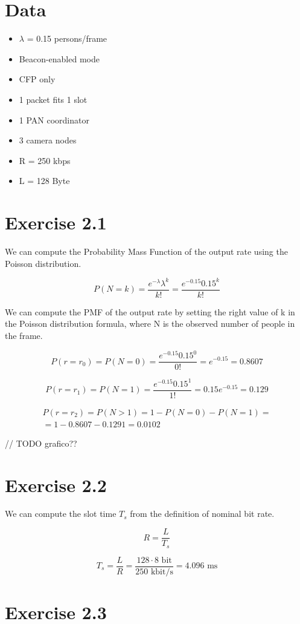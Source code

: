 \section{Data}
\begin{itemize}
\item $\lambda$ = 0.15 persons/frame
\item Beacon-enabled mode
\item CFP only
\item 1 packet fits 1 slot
\item 1 PAN coordinator
\item 3 camera nodes
\item R = 250 kbps
\item L = 128 Byte
\end{itemize}

\section{Exercise 2.1}
We can compute the Probability Mass Function of the output rate using the Poisson distribution.

\begin{equation}
P(N = k) = \frac{e^{-\lambda} \lambda^k}{k!} = \frac{e^{-0.15} 0.15^k}{k!}
\end{equation}

We can compute the PMF of the output rate by setting the right value of k in the Poisson distribution formula, where N is the observed number of people in the frame.

\begin{equation}
P(r = r_0) = P(N = 0) = \frac{e^{-0.15} 0.15^0}{0!} = e^{-0.15} = 0.8607
\end{equation}

\begin{equation}
P(r = r_1) = P(N = 1) = \frac{e^{-0.15} 0.15^1}{1!} = 0.15 e^{-0.15} = 0.129
\end{equation}

\begin{equation}
\begin{split}
	P(r = r_2) = P(N > 1) = 1 - P(N = 0) - P(N = 1) = \\
	= 1- 0.8607 - 0.1291 = 0.0102
\end{split}
\end{equation}

// TODO grafico??

\section{Exercise 2.2}
We can compute the slot time $T_{s}$ from the definition of nominal bit rate.

\begin{equation}
R = \frac{L}{T_{s}}
\end{equation}

\begin{equation}
T_{s} = \frac{L}{R} = \frac{128 \cdot 8\text{ bit}}{250\text{ kbit/s}} = 4.096\text{ ms}
\end{equation}

\section{Exercise 2.3}






